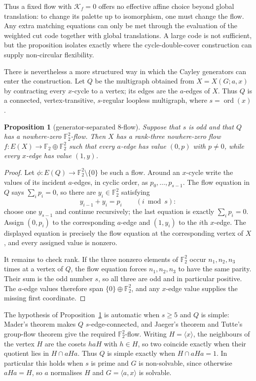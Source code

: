 \documentclass[11pt,a4paper]{article}
\newtheorem{proposition}[theorem]{Proposition}
\theoremstyle{definition}
\theoremstyle{remark}
\newcommand{\ord}{\operatorname{ord}}
\newcommand{\X}[3]{X(#1;#2,#3)}
\begin{document}
Thus a fixed flow with $\mathcal K_f=0$ offers no effective affine choice beyond global translation: to change its palette up to isomorphism, one must change the flow.  Any extra matching equations can only be met through the evaluation of the weighted cut code together with global translations.  A large code is not sufficient, but the proposition isolates exactly where the cycle-double-cover construction can supply non-circular flexibility.

There is nevertheless a more structured way in which the Cayley generators can enter the construction.  Let $Q$ be the multigraph obtained from $X=\X{G}{a}{x}$ by contracting every $x$-cycle to a vertex; its edges are the $a$-edges of $X$.  Thus $Q$ is a connected, vertex-transitive, $s$-regular loopless multigraph, where $s=\ord(x)$.

\begin{proposition}[generator-separated $8$-flow]\label{prop:separated-eight-flow}
Suppose that $s$ is odd and that $Q$ has a nowhere-zero $\mathbb F_2^2$-flow.  Then $X$ has a rank-three nowhere-zero flow $f\colon E(X)\to\mathbb F_2\oplus\mathbb F_2^2$ such that every $a$-edge has value $(0,p)$ with $p\ne0$, while every $x$-edge has value $(1,y)$.
\end{proposition}
\begin{proof}
Let $\phi\colon E(Q)\to\mathbb F_2^2\setminus\{0\}$ be such a flow.  Around an $x$-cycle write the values of its incident $a$-edges, in cyclic order, as $p_0,\ldots,p_{s-1}$.  The flow equation in $Q$ says $\sum_i p_i=0$, so there are $y_i\in\mathbb F_2^2$ satisfying
\[
 y_{i-1}+y_i=p_i\qquad(i\bmod s):
\]
choose one $y_{s-1}$ and continue recursively; the last equation is exactly $\sum_i p_i=0$.  Assign $(0,p_i)$ to the corresponding $a$-edge and $(1,y_i)$ to the $i$th $x$-edge.  The displayed equation is precisely the flow equation at the corresponding vertex of $X$, and every assigned value is nonzero.

It remains to check rank.  If the three nonzero elements of $\mathbb F_2^2$ occur $n_1,n_2,n_3$ times at a vertex of $Q$, the flow equation forces $n_1,n_2,n_3$ to have the same parity.  Their sum is the odd number $s$, so all three are odd and in particular positive.  The $a$-edge values therefore span $\{0\}\oplus\mathbb F_2^2$, and any $x$-edge value supplies the missing first coordinate.
\end{proof}

The hypothesis of Proposition~\ref{prop:separated-eight-flow} is automatic when $s\ge5$ and $Q$ is simple: Mader's theorem makes $Q$ $s$-edge-connected, and Jaeger's theorem and Tutte's group-flow theorem give the required $\mathbb F_2^2$-flow.  Writing $H=\langle x\rangle$, the neighbours of the vertex $H$ are the cosets $haH$ with $h\in H$, so two coincide exactly when their quotient lies in $H\cap aHa$.  Thus $Q$ is simple exactly when $H\cap aHa=1$.  In particular this holds when $s$ is prime and $G$ is non-solvable, since otherwise $aHa=H$, so $a$ normalises $H$ and $G=\langle a,x\rangle$ is solvable.
\end{document}
